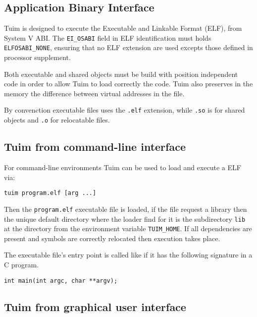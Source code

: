 \documentclass[
   article,                      %
   10pt,                         %
   openright,                    %
   oneside,                      %
   a4paper,                      %
   sumario = tradicional,        %
   english,                      %
   xcolor=table                  %
]{abntex2}
\begin{document}
\subsection{Application Binary Interface}

Tuim is designed to execute the
Executable and Linkable Format (ELF),
from System V\cite{systemv} ABI.
The \texttt{EI\_OSABI} field in ELF identification
must holds \texttt{ELFOSABI\_NONE},
ensuring that no ELF extension are used excepts those defined in
processor supplement.

Both executable and shared objects must be build
with position independent code in order to allow Tuim
to load correctly the code.
Tuim also preserves in the memory the
difference between virtual addresses in the file.

By convenction executable files uses the \texttt{.elf} extension,
while \texttt{.so} is for shared objects and
\texttt{.o} for relocatable files.

\subsection{Tuim from command-line interface}

For command-line environments Tuim can be used to load and execute
a ELF via:

\begin{lstlisting}[style=bash]
tuim program.elf [arg ...]
\end{lstlisting}

Then the \texttt{program.elf} executable file is loaded,
if the file request a library then the unique default directory
where the loader find for it is
the subdirectory \texttt{lib} at the directory from the
environment variable \texttt{TUIM\_HOME}.
If all dependencies are present and symbols are correctly
relocated then execution takes place.

The executable file's entry point is called like if it has
the following signature in a C program.

\begin{lstlisting}[style=c]
int main(int argc, char **argv);
\end{lstlisting}

\subsection{Tuim from graphical user interface}
\end{document}
